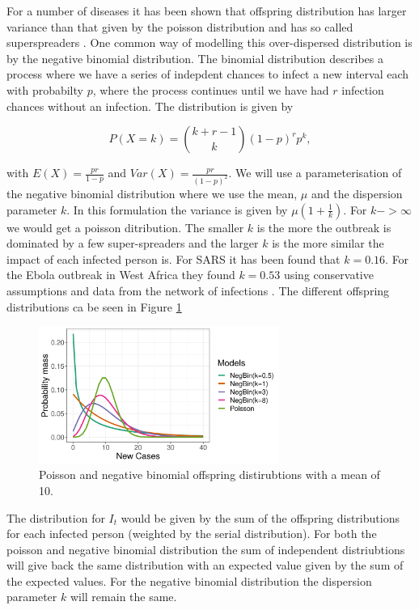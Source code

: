 \documentclass[12pt]{article}
\begin{document}
For a number of diseases it has been shown that offspring distribution has larger variance than that given by the poisson distribution and has so called superspreaders \cite{lloyd-smithSuperspreadingEffectIndividual2005}. One common way of modelling this over-dispersed distribution is by the negative binomial distribution. The binomial distribution describes a process where we have a series of indepdent chances to infect a new interval each with probabilty $p$, where the process continues until we have had $r$ infection chances without an infection. The distribution is given by

\[P(X=k) = {k + r - 1 \choose k} (1-p)^rp^k, \]

with $E(X)=\frac{pr}{1-p}$ and $Var(X) = \frac{pr}{(1-p)^2}$. We will use a parameterisation of the negative binomial distribution where we use the mean, $\mu$ and the dispersion parameter $k$. In this formulation the variance is given by $\mu(1 + \frac{1}{k})$. For $k->\infty$ we would get a poisson ditribution. The smaller $k$ is the more the outbreak is dominated by a few super-spreaders and the larger $k$ is the more similar the impact of each infected person is. For SARS it has been found that $k=0.16$\cite{lloyd-smithSuperspreadingEffectIndividual2005}. For the Ebola outbreak in West Africa they found $k=0.53$ using conservative assumptions and data from the network of infections \cite{internationalebolaresponseteamExposurePatternsDriving2016}. The different offspring distributions ca be seen in Figure \ref{fig:offspring}

\begin{figure}[h]
  \centering
  \includegraphics[width=0.7\textwidth]{../output/prob_dist.png}
  \caption{Poisson and negative binomial offspring distirubtions with a mean of 10.}
  \label{fig:offspring}
\end{figure}




The distribution for $I_t$ would be given by the sum of the offspring distributions for each infected person (weighted by the serial distribution). For both the poisson and negative binomial distribution the sum of independent distriubtions will give back the same distribution with an expected value given by the sum of the expected values. For the negative binomial distribution the dispersion parameter $k$ will remain the same. 
\end{document}
